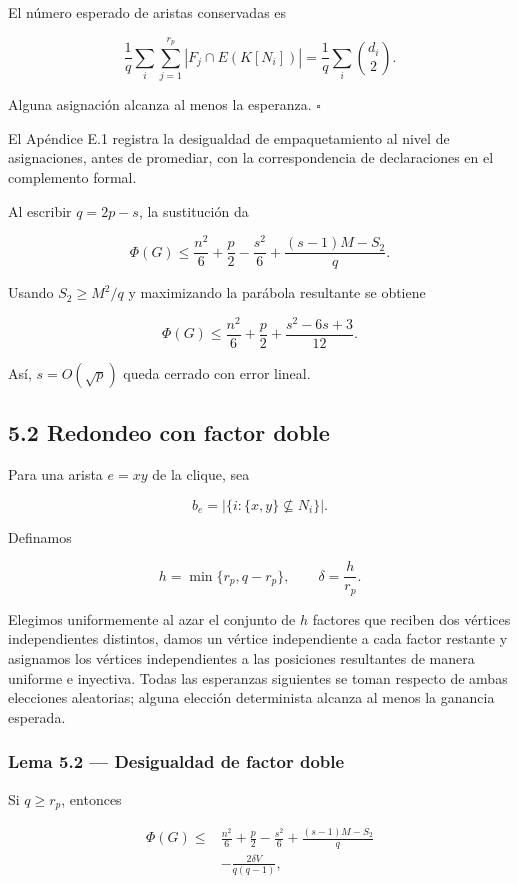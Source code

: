 \documentclass[spanish,11pt,a4paper]{article}
\begin{document}
El número esperado de aristas conservadas es

\[
\frac1q\sum_i\sum_{j=1}^{r_p}|F_j\cap E(K[N_i])|
=
\frac1q\sum_i\binom{d_i}{2}.
\]

Alguna asignación alcanza al menos la esperanza. \(\square\)

El Apéndice E.1 registra la desigualdad de empaquetamiento al nivel de
asignaciones, antes de promediar, con la correspondencia de
declaraciones en el complemento formal.

Al escribir \(q=2p-s\), la sustitución da

\[
\Phi(G)
\le
\frac{n^2}{6}+\frac p2-\frac{s^2}{6}
+
\frac{(s-1)M-S_2}{q}.
\tag{5.2}
\]

Usando \(S_2\ge M^2/q\) y maximizando la parábola resultante se obtiene

\[
\boxed{
\Phi(G)
\le
\frac{n^2}{6}+\frac p2+\frac{s^2-6s+3}{12}
}.
\tag{5.3}
\]

Así, \(s=O(\sqrt p)\) queda cerrado con error lineal.

\subsection{5.2 Redondeo con factor
doble}\label{redondeo-con-factor-doble}

Para una arista \(e=xy\) de la clique, sea

\[
b_e=|\{i:\{x,y\}\not\subseteq N_i\}|.
\]

Definamos

\[
h=\min\{r_p,q-r_p\},
\qquad
\delta=\frac h{r_p}.
\]

Elegimos uniformemente al azar el conjunto de \(h\) factores que reciben
dos vértices independientes distintos, damos un vértice independiente a
cada factor restante y asignamos los vértices independientes a las
posiciones resultantes de manera uniforme e inyectiva. Todas las
esperanzas siguientes se toman respecto de ambas elecciones aleatorias;
alguna elección determinista alcanza al menos la ganancia esperada.

\subsubsection{Lema 5.2 --- Desigualdad de factor
doble}\label{lema-5.2-desigualdad-de-factor-doble}

Si \(q\ge r_p\), entonces

\[
\boxed{
\begin{aligned}
\Phi(G)
\le{}&
\frac{n^2}{6}+\frac p2-\frac{s^2}{6}
+
\frac{(s-1)M-S_2}{q}\\
&-
\frac{2\delta V}{q(q-1)},
\end{aligned}
}
\tag{5.4}
\]
\end{document}
